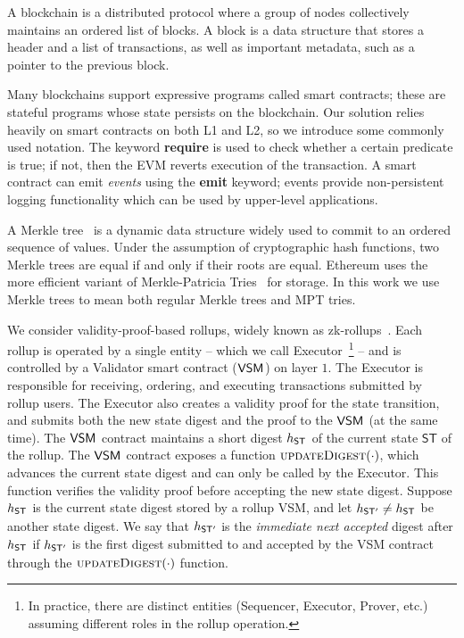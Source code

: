 



A blockchain is a distributed protocol where a group of nodes collectively maintains an ordered list of blocks. A block is a data structure that stores a header and a list of transactions, as well as important metadata, such as a pointer to the previous block. 

Many blockchains support expressive programs called smart contracts; these are stateful programs whose state persists on the blockchain. Our solution relies heavily on smart contracts on both L1 and L2, so we introduce some commonly used notation. The keyword \textbf{require} is used to check whether a certain predicate is true; if not, then the EVM reverts execution of the transaction. A smart contract can emit \emph{events} using the \textbf{emit} keyword; events provide non-persistent logging functionality which can be used by upper-level applications.

 A Merkle tree~\cite{merkle-tree} is a dynamic data structure widely used to commit to an ordered sequence of values. Under the assumption of cryptographic hash functions, two Merkle trees are equal if and only if their roots are equal. Ethereum uses the more efficient variant of Merkle-Patricia Tries~\cite{mpt-trie} for storage. In this work we use Merkle trees to mean both regular Merkle trees and MPT tries.

\newcommand{\scstruct}[1]{\mathsf{SC}_{#1}}

 We consider validity-proof-based rollups, widely known as zk-rollups~\cite{eth-org-zk-rollups}. Each rollup is operated by a single entity -- which we call Executor~\footnote{In practice, there are distinct entities (Sequencer, Executor, Prover, etc.) assuming different roles in the rollup operation.} -- and is controlled by a Validator smart contract ($\mathsf{VSM}_{}$) on layer $1$. The Executor is responsible for receiving, ordering, and executing transactions submitted by rollup users. The Executor also creates a validity proof for the state transition, and submits both the new state digest and the proof to the $\mathsf{VSM}_{}$ (at the same time). The $\mathsf{VSM}_{}$ contract maintains a short digest $h_{\mathsf{ST_{}}}$ of the current state $\mathsf{ST}$ of the rollup. The $\mathsf{VSM}_{}$ contract exposes a function $\textproc{updateDigest}(\cdot)$, which advances the current state digest and can only be called by the Executor. This function verifies the validity proof before accepting the new state digest. Suppose $h_{\mathsf{ST_{}}}$ is the current state digest stored by a rollup VSM, and let $h_{\mathsf{ST_{}'}} \neq h_{\mathsf{ST_{}}}$ be another state digest. We say that $h_{\mathsf{ST_{}'}}$ is the \emph{immediate next accepted} digest after $h_{\mathsf{ST_{}}}$ if $h_{\mathsf{ST_{}'}}$ is the first digest submitted to and accepted by the VSM contract through the $\textproc{updateDigest}(\cdot)$ function. 

